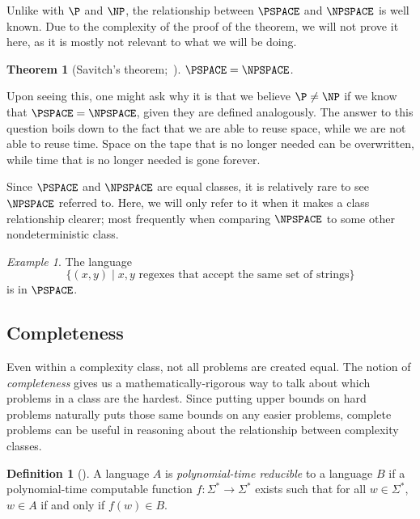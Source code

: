 \documentclass[english,12pt]{reedthesis}
\theoremstyle{plain}
\newtheorem{thm}{Theorem}[section]
\theoremstyle{definition}
\newtheorem{defn}[defn]{Definition}
\theoremstyle{remark}
\newtheorem{example}{Example}[thm]
\begin{document}
Unlike with $\P$ and $\NP$, the relationship between $\PSPACE$ and $\NPSPACE$ is
well known. Due to the complexity of the proof of the theorem, we will not prove
it here, as it is mostly not relevant to what we will be doing.

\begin{thm}[{Savitch's theorem;~\cite{Sav70}}]\label{thm:savitch}
  $\PSPACE = \NPSPACE$.
\end{thm}

Upon seeing this, one might ask why it is that we believe $\P \ne \NP$ if we know
that $\PSPACE = \NPSPACE$, given they are defined analogously. The answer to
this question boils down to the fact that we are able to reuse space, while we
are not able to reuse time. Space on the tape that is no longer needed can be
overwritten, while time that is no longer needed is gone forever.

Since $\PSPACE$ and $\NPSPACE$ are equal classes, it is relatively rare to see
$\NPSPACE$ referred to. Here, we will only refer to it when it makes a class
relationship clearer; most frequently when comparing $\NPSPACE$ to some other
nondeterministic class.

\begin{example}\label{ex:regex-is-pspace}
  The language
  \[
    \{(x, y) \mid x, y \text{ regexes that accept the same set of strings}\}
  \]
  is in $\PSPACE$.
\end{example}

\subsection{Completeness}

Even within a complexity class, not all problems are created equal. The notion
of \emph{completeness} gives us a mathematically-rigorous way to talk about
which problems in a class are the hardest. Since putting upper bounds on hard
problems naturally puts those same bounds on any easier problems, complete
problems can be useful in reasoning about the relationship between complexity
classes.

\begin{defn}[{\cite[Def.\ 7.29]{Sip97}}]\label{def:p-reduction}
  A language $A$ is \emph{polynomial-time reducible} to a language $B$ if a
  polynomial-time computable function $f\colon \Sigma^{*} \rightarrow \Sigma^{*}$ exists
  such that for all $w \in \Sigma^{*}$, $w \in A$ if and only if $f(w) \in B$.
\end{defn}
\end{document}
